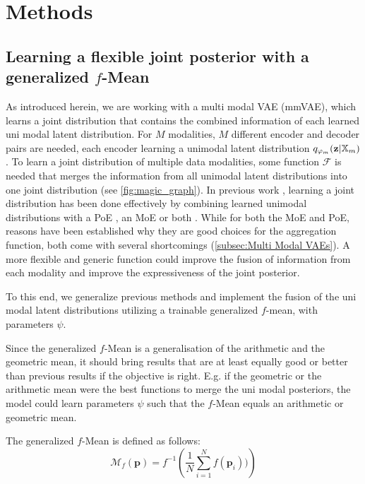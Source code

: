 \chapter{Methods}
\label{sec:methods}

\section{Learning a flexible joint posterior with a generalized $f$-Mean}
As introduced herein, we are working with a multi modal VAE (mmVAE), which learns a joint distribution that contains the combined information of each learned uni modal latent distribution.
For $M$ modalities, $M$ different encoder and decoder pairs are needed, each encoder learning a unimodal latent distribution $q_{\varphi_m}(\textbf{z}|\mathbb{X}_m)$.
To learn a joint distribution of multiple data modalities, some function $\mathcal{F}$ is needed that merges the information from all unimodal latent distributions into one joint distribution (see \cref{fig:magic_graph}).
In previous work \parencite{poe,shi_variational_2019,sutter_generalized_2020}, learning a joint distribution has been done effectively by combining learned unimodal distributions with a PoE \parencite{poe}, an MoE \parencite{shi_variational_2019} or both \parencite{sutter_generalized_2020}.
While for both the MoE and PoE, reasons have been established why they are good choices for the aggregation function, both come with several shortcomings (\cref{subsec:Multi Modal VAEs}).
A more flexible and generic function could improve the fusion of information from each modality and improve the expressiveness of the joint posterior.

To this end, we generalize previous methods and implement the fusion of the uni modal latent distributions utilizing a trainable generalized $f$-mean, with parameters $\psi$.

Since the generalized $f$-Mean is a generalisation of the arithmetic and the geometric mean, it should bring results that are at least equally good or better than previous results if the objective is right.
E.g. if the geometric or the arithmetic mean were the best functions to merge the uni modal posteriors, the model could learn parameters $\psi$ such that the $f$-Mean equals an arithmetic or geometric mean.

The generalized $f$-Mean is defined as follows:
\begin{equation}
    \label{gfm}
    \mathcal{M}_{f}\left( \textbf{p} \right) = f^{-1}\left( \frac{1}{N} \sum ^N _{i=1} f(\textbf{p}_i)) \right)
\end{equation}

